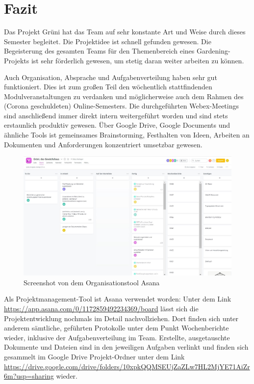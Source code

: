 \hypertarget{fazit}{%
\section{Fazit}\label{fazit}}

Das Projekt Grüni hat das Team auf sehr konstante Art und Weise durch
dieses Semester begleitet. Die Projektidee ist schnell gefunden gewesen.
Die Begeisterung des gesamten Teams für den Themenbereich eines
Gardening-Projekts ist sehr förderlich gewesen, um stetig daran weiter
arbeiten zu können.

Auch Organisation, Absprache und Aufgabenverteilung haben sehr gut
funktioniert. Dies ist zum großen Teil den wöchentlich stattfindenden
Modulveranstaltungen zu verdanken und möglicherweise auch dem Rahmen des
(Corona geschuldeten) Online-Semesters. Die durchgeführten
Webex-Meetings sind anschließend immer direkt intern weitergeführt
worden und sind stets erstaunlich produktiv gewesen. Über Google Drive,
Google Documents und ähnliche Tools ist gemeinsames Brainstorming,
Festhalten von Ideen, Arbeiten an Dokumenten und Anforderungen
konzentriert umsetzbar gewesen.

\begin{figure}
\centering
\includegraphics{img/asana.JPG}
\caption{Screenshot von dem Organisationstool Asana}
\end{figure}

Als Projektmanagement-Tool ist Asana verwendet worden: Unter dem Link
\url{https://app.asana.com/0/1172859492234369/board} lässt sich die
Projektentwicklung nochmals im Detail nachvollziehen. Dort finden sich
unter anderem sämtliche, geführten Protokolle unter dem Punkt
Wochenberichte wieder, inklusive der Aufgabenverteilung im Team.
Erstellte, ausgetauschte Dokumente und Dateien sind in den jeweiligen
Aufgaben verlinkt und finden sich gesammelt im Google Drive
Projekt-Ordner unter dem Link
\url{https://drive.google.com/drive/folders/10xpkQQMSEUjZaZLw7HL2MjYE71AiZr6m?usp=sharing}
wieder.

